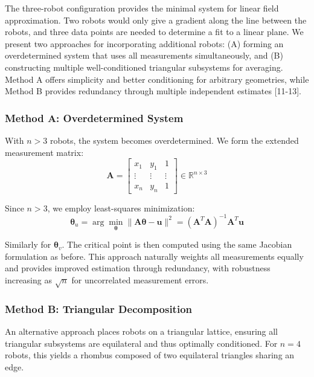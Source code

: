 \documentclass[lettersize,journal]{IEEEtran}
\begin{document}
The three-robot configuration provides the minimal system for linear field approximation. Two robots would only give a gradient along the line between the robots, and three data points are needed to determine a fit to a linear plane. We present two approaches for incorporating additional robots: (A) forming an overdetermined system that uses all measurements simultaneously, and (B) constructing multiple well-conditioned triangular subsystems for averaging. Method A offers simplicity and better conditioning for arbitrary geometries, while Method B provides redundancy through multiple independent estimates [11-13].

\subsubsection{Method A: Overdetermined System}

With $n > 3$ robots, the system becomes overdetermined. We form the extended measurement matrix:
\begin{equation}
\mathbf{A} = \begin{bmatrix} x_1 & y_1 & 1 \\ \vdots & \vdots & \vdots \\ x_n & y_n & 1 \end{bmatrix} \in \mathbb{R}^{n \times 3}
\end{equation}

Since $n > 3$, we employ least-squares minimization:
\begin{equation}
\boldsymbol{\theta}_u = \arg\min_{\boldsymbol{\theta}} \|\mathbf{A}\boldsymbol{\theta} - \mathbf{u}\|^2 = (\mathbf{A}^T\mathbf{A})^{-1}\mathbf{A}^T\mathbf{u}
\end{equation}

Similarly for $\boldsymbol{\theta}_v$. The critical point is then computed using the same Jacobian formulation as before. This approach naturally weights all measurements equally and provides improved estimation through redundancy, with robustness increasing as $\sqrt{n}$ for uncorrelated measurement errors.

\subsubsection{Method B: Triangular Decomposition}

An alternative approach places robots on a triangular lattice, ensuring all triangular subsystems are equilateral and thus optimally conditioned. For $n = 4$ robots, this yields a rhombus composed of two equilateral triangles sharing an edge.
\end{document}
